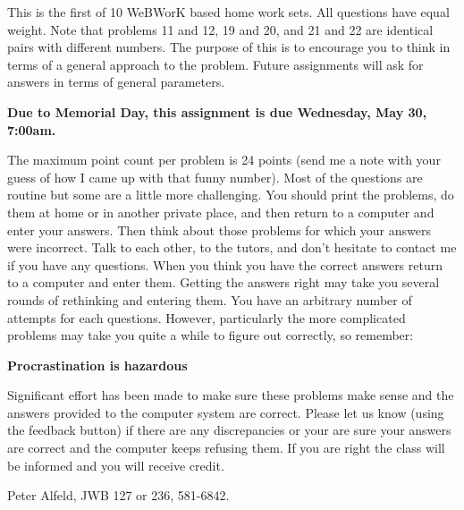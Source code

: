 

This is the first of 10 WeBWorK based home work sets.  All
questions have equal weight.  Note that problems 11 and 12, 19 and 20,
and 21 and 22 are identical pairs with different numbers.  The purpose
of this is to encourage you to think in terms of a general approach to
the problem.  Future assignments will ask for answers in terms of
general parameters.

{\bf Due to Memorial Day, this assignment is due Wednesday, May 30, 7:00am.}


The maximum point count per problem is 24 points (send me a note with
your guess of how I came up with that funny number).  Most of the
questions are routine but some are a little more challenging.  You
should print the problems, do them at home or in another private
place, and then return to a computer and enter your answers.  Then
think about those problems for which your answers were incorrect.
Talk to each other, to the tutors, and don't hesitate to contact me if
you have any questions.  When you think you have the correct answers
return to a computer and enter them.  Getting the answers right may
take you several rounds of rethinking and entering them.  You have an
arbitrary number of attempts for each questions.  However, particularly the
more complicated problems may take you quite a while to figure out
correctly, so remember:

\bigskip\centerline{\large \bf Procrastination is hazardous}\bigskip

Significant effort has been made to make sure these problems make
sense and the answers provided to the computer system are correct.
Please let us know (using the feedback button)
if there are any discrepancies or your are sure
your answers are correct and the computer keeps refusing them. If you
are right the class will be informed and you will receive credit.

Peter Alfeld, JWB 127 or 236, 581-6842.

